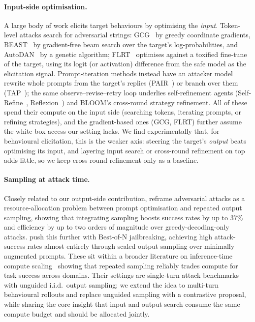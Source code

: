 \paragraph{Input-side optimisation.}
A large body of work elicits target behaviours by optimising the \emph{input}.
Token-level attacks search for adversarial strings: GCG~\citep{zou2023universal} by greedy coordinate gradients, BEAST~\citep{sadasivan2024fast} by gradient-free beam search over the target's log-probabilities, and AutoDAN~\citep{liu2023autodan} by a genetic algorithm; FLRT~\citep{thompson2024flrt} optimises against a toxified fine-tune of the target, using its logit (or activation) difference from the safe model as the elicitation signal.
Prompt-iteration methods instead have an attacker model rewrite whole prompts from the target's replies (PAIR~\citep{chao2023jailbreaking}) or branch over them (TAP~\citep{mehrotra2023tap}); the same observe--revise--retry loop underlies self-refinement agents (Self-Refine~\citep{madaan2023selfrefine}, Reflexion~\citep{shinn2023reflexion}) and BLOOM's cross-round strategy refinement.
All of these spend their compute on the input side (searching tokens, iterating prompts, or refining strategies), and the gradient-based ones (GCG, FLRT) further assume the white-box access our setting lacks.
We find experimentally that, for behavioural elicitation, this is the weaker axis: steering the target's \emph{output} beats optimising its input, and layering input search or cross-round refinement on top adds little, so we keep cross-round refinement only as a baseline.


\paragraph{Sampling at attack time.}
Closely related to our output-side contribution, \citet{beyer2026sampling} reframe adversarial attacks as a resource-allocation problem between prompt optimisation and repeated output sampling, showing that integrating sampling boosts success rates by up to 37\% and efficiency by up to two orders of magnitude over greedy-decoding-only attacks.
\citet{hughes2024bon} push this further with Best-of-N jailbreaking, achieving high attack-success rates almost entirely through scaled output sampling over minimally augmented prompts.
These sit within a broader literature on inference-time compute scaling~\citep{brown2024monkeys,snell2024scaling} showing that repeated sampling reliably trades compute for task success across domains.
Their settings are single-turn attack benchmarks with unguided i.i.d.\ output sampling; we extend the idea to multi-turn behavioural rollouts and replace unguided sampling with a contrastive proposal, while sharing the core insight that input and output search consume the same compute budget and should be allocated jointly.


